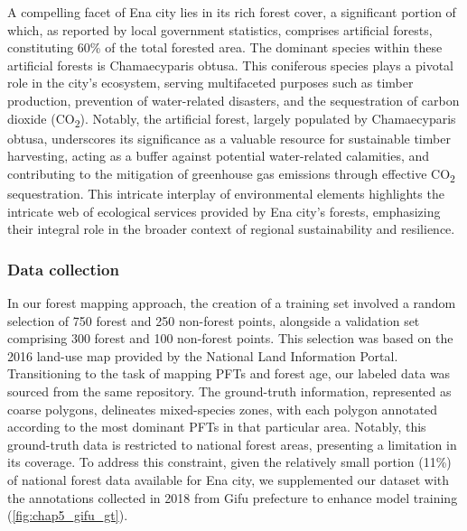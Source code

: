 A compelling facet of Ena city lies in its rich forest cover, a significant portion of which, as reported by local government statistics, comprises artificial forests, constituting 60\% of the total forested area. The dominant species within these artificial forests is Chamaecyparis obtusa. This coniferous species plays a pivotal role in the city's ecosystem, serving multifaceted purposes such as timber production, prevention of water-related disasters, and the sequestration of carbon dioxide (CO\textsubscript{2}). Notably, the artificial forest, largely populated by Chamaecyparis obtusa, underscores its significance as a valuable resource for sustainable timber harvesting, acting as a buffer against potential water-related calamities, and contributing to the mitigation of greenhouse gas emissions through effective CO\textsubscript{2} sequestration. This intricate interplay of environmental elements highlights the intricate web of ecological services provided by Ena city's forests, emphasizing their integral role in the broader context of regional sustainability and resilience. \par

\subsubsection{Data collection}
In our forest mapping approach, the creation of a training set involved a random selection of 750 forest and 250 non-forest points, alongside a validation set comprising 300 forest and 100 non-forest points. This selection was based on the 2016 land-use map provided by the National Land Information Portal. Transitioning to the task of mapping PFTs and forest age, our labeled data was sourced from the same repository. The ground-truth information, represented as coarse polygons, delineates mixed-species zones, with each polygon annotated according to the most dominant PFTs in that particular area. Notably, this ground-truth data is restricted to national forest areas, presenting a limitation in its coverage. To address this constraint, given the relatively small portion (11\%) of national forest data available for Ena city, we supplemented our dataset with the annotations collected in 2018 from Gifu prefecture to enhance model training (\ref{fig:chap5_gifu_gt}). \par


